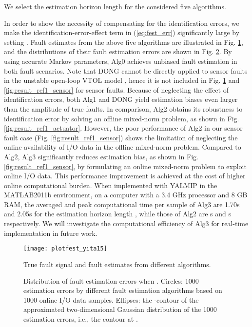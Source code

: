 \documentclass[twocolumn]{autart}
\begin{document}
We select the estimation horizon length  for the considered five algorithms.

In order to show the necessity of compensating for the identification errors, we make the identification-error-effect term 
in (\ref{eq:fest_err}) significantly large by setting . Fault estimates from the above five algorithms are illustrated in Fig. \ref{fig:plotfest}, and the distributions of their fault estimation errors are shown in Fig. \ref{fig:result_ref1}.
By using accurate Markov parameters, Alg0 achieves unbiased fault estimation in both fault scenarios. Note that DONG cannot be directly applied to sensor faults in the unstable open-loop VTOL model \cite{Dong2012c}, hence it is not included in Fig. \ref{fig:plotfest} and \ref{fig:result_ref1_sensor} for sensor faults.
Because of neglecting the effect of identification errors, both Alg1 and DONG yield estimation biases even larger than the amplitude of true faults. In comparison, Alg2 obtains its robustness to identification error by solving an offline mixed-norm  problem, as shown in Fig. \ref{fig:result_ref1_actuator}. However, the poor performance of Alg2 in our sensor fault case (Fig. \ref{fig:result_ref1_sensor}) shows the limitation of neglecting the online availability of I/O data in the offline mixed-norm problem. 
Compared to Alg2, Alg3 significantly reduces estimation bias, as shown in Fig. \ref{fig:result_ref1_sensor}, by formulating an online mixed-norm problem to exploit online I/O data. This performance improvement is achieved at the cost of higher online computational burden. When implemented with YALMIP \cite{Lofberg2004} in the MATLAB2011b environment, on a computer with a 3.4 GHz processor and 8 GB RAM, the averaged and peak computational time per sample of Alg3 are 1.70s and 2.05s for the estimation horizon length , while those of Alg2 are s and s respectively. We will investigate the computational efficiency of Alg3 for real-time implementation in future work.

\begin{figure}[h]
	\centering
	\texttt{[image: plotfest\_yita15]}
	\caption{True fault signal and fault estimates from different algorithms.}
	\label{fig:plotfest}
\end{figure}



\begin{figure}[h]
\centering
{}
\caption{Distribution of fault estimation errors when . Circles: 1000 estimation errors by different fault estimation algorithms based on 1000 online I/O data samples. Ellipses: the -contour of the approximated two-dimensional Gaussian distribution of the 1000 estimation errors, i.e., the contour at .}
\label{fig:result_ref1}
\end{figure}
\end{document}
